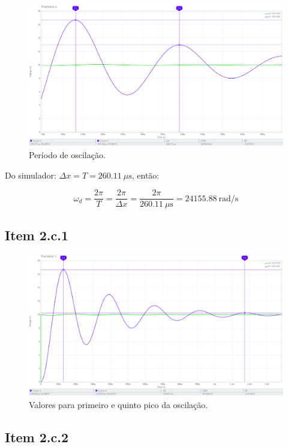 \documentclass[11pt]{article}
\begin{document}
\begin{figure}[h!]
  \centering
  \includegraphics[width=\textwidth]{fig/2b}
  \caption{Período de oscilação.}
  \label{fig:2b}
\end{figure}

Do simulador: $\Delta x = T = 260.11\ \mu\text{s}$, então:

$$
  \omega_{d} = \frac{2\pi}{T} = \frac{2\pi}{\Delta x} = \frac{2\pi}{260.11\ \mu\text{s}} = 24155.88\ \text{rad/s}
$$

\subsection*{Item 2.c.1}

\begin{figure}[h!]
  \centering
  \includegraphics[width=\textwidth]{fig/2c1}
  \caption{Valores para primeiro e quinto pico da oscilação.}
  \label{fig:2c1}
\end{figure}

\subsection*{Item 2.c.2}
\end{document}
